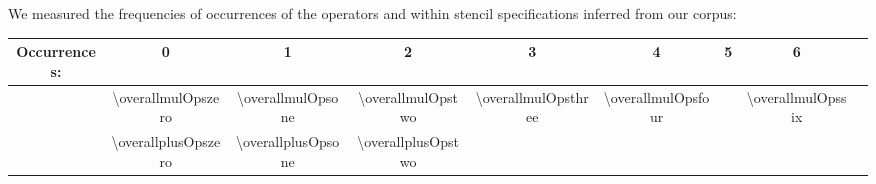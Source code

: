 

We measured the frequencies of occurrences of the operators \term{*} and \term{+} within stencil specifications inferred from our corpus:
\begin{center}
\vspace{0.25em}
\setlength{\tabcolsep}{0.57em}
{\small{
\hspace{-1em}\begin{tabular}{c|cccccccc}
Occurrences: & 0 & 1 & 2 & 3 & 4 & 5 & 6  \\ \hline
\term{*} & \num{\overallmulOpszero} & \num{\overallmulOpsone} & \num{\overallmulOpstwo} & \num{\overallmulOpsthree} & \num{\overallmulOpsfour} &  & \num{\overallmulOpssix} \\
\term{+} & \num{\overallplusOpszero} & \num{\overallplusOpsone} & \num{\overallplusOpstwo}
\end{tabular}}}
\vspace{0.2em}
\end{center}

